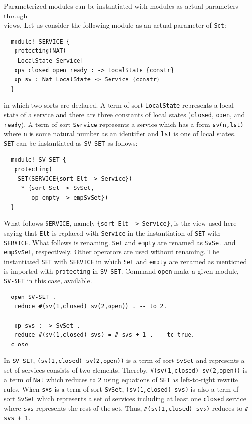 \documentclass[12pt]{report}
\newcommand{\stt}[1]{{\small{\tt {#1}}}}
\begin{document}
Parameterized modules can be instantiated with modules as actual
parameters through\\ views. Let us consider the following module
as an actual parameter of {\tt Set}:
\small
\begin{verbatim}
  module! SERVICE {
   protecting(NAT)
   [LocalState Service]
   ops closed open ready : -> LocalState {constr}
   op sv : Nat LocalState -> Service {constr}
  }
\end{verbatim}
\normalsize
in which two sorts are declared.  A term of sort {\tt LocalState}
represents a local state of a service and there are three constants of
local states ({\tt closed}, {\tt open}, and {\tt ready}).  A term of
sort {\tt Service} represents a service which has a form
\stt{sv(n,lst)} where {\tt n} is some natural number as an identifier
and {\tt lst} is one of local states.  {\tt SET} can be instantiated
as {\tt SV-SET} as follows:
\small
\begin{verbatim}
  module! SV-SET {
   protecting(
    SET(SERVICE{sort Elt -> Service})
     * {sort Set -> SvSet,
        op empty -> empSvSet})
  }
\end{verbatim}
\normalsize
What follows {\tt SERVICE}, namely \stt{\{sort Elt -> Service\}}, is
the view used here saying that {\tt Elt} is replaced with
{\tt Service} in the instantiation of {\tt SET} with
{\tt SERVICE}. What follows {\tt *} is renaming. {\tt Set} and
{\tt empty} are renamed as {\tt SvSet} and {\tt empSvSet},
respectively. Other operators are used without renaming.
The instantiated {\tt SET} with {\tt SERVICE} in which {\tt Set} and
{\tt empty} are renamed as mentioned is imported with {\tt protecting}
in {\tt SV-SET}. Command {\tt open} make a given module, {\tt SV-SET}
in this case, available.
\small
\begin{verbatim}
  open SV-SET .
   reduce #(sv(1,closed) sv(2,open)) . -- to 2.

   op svs : -> SvSet .
   reduce #(sv(1,closed) svs) = # svs + 1 . -- to true.
  close
\end{verbatim}
\normalsize
In {\tt SV-SET}, \stt{(sv(1,closed) sv(2,open))} is a term of sort
{\tt SvSet} and represents a set of services consists of two elements.
Thereby, \stt{\#(sv(1,closed) sv(2,open))} is a term of {\tt Nat} which
reduces to {\tt 2} using equations of {\tt SET} as left-to-right
rewrite rules. When {\tt svs} is a term of sort {\tt SvSet},
\stt{(sv(1,closed) svs)} is also a term of sort {\tt SvSet} which
represents a set of services including at least one {\tt closed}
service where {\tt svs} represents the rest of the set. Thus,
\stt{\#(sv(1,closed) svs)} reduces to \stt{\# svs + 1}.
\end{document}
